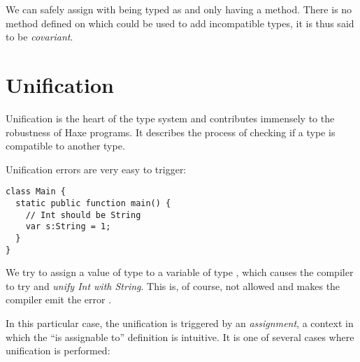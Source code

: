 
We can safely assign with  being typed as  and  only having a  method. There is no method defined on  which could be used to add incompatible types, it is thus said to be \emph{covariant}.






\section{Unification}
\label{type-system-unification}


Unification is the heart of the type system and contributes immensely to the robustness of Haxe programs. It describes the process of checking if a type is compatible to another type.


Unification errors are very easy to trigger:

\begin{lstlisting}
class Main {
  static public function main() {
    // Int should be String
    var s:String = 1;
  }
}
\end{lstlisting}
We try to assign a value of type  to a variable of type , which causes the compiler to try and \emph{unify Int with String}. This is, of course, not allowed and makes the compiler emit the error .

In this particular case, the unification is triggered by an \emph{assignment}, a context in which the ``is assignable to'' definition is intuitive. It is one of several cases where unification is performed:

